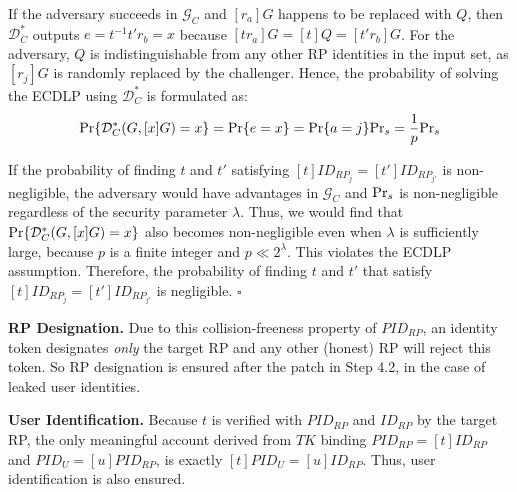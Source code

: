 If the adversary succeeds in $\mathcal{G}_C$ and $[r_a]G$ happens to be replaced with $Q$, then $\mathcal{D}^*_C$ outputs $e=t^{-1}t'r_b =x$ because $[tr_a]G = [t]Q = [t'r_b]G$. For the adversary, $Q$ is indistinguishable from any other RP identities in the input set, as $[r_j]G$ is randomly replaced by the challenger.
Hence, the probability of solving the ECDLP using $\mathcal{D}^*_C$ is formulated as:
\begin{equation*}
{\rm Pr}\{\mathcal{D}^*_C(G, [x]G)=x\} = {\rm Pr}\{e = x\}={\rm Pr}\{a=j\}{\rm Pr}_s=\frac{1}{p}{\rm Pr}_s
\end{equation*}

If the probability of finding $t$ and $t'$ satisfying $[t]ID_{RP_j} = [t']ID_{RP_{j'}}$ is non-negligible, the adversary would have advantages  in $\mathcal{G}_C$ and ${\rm Pr}_s$ is non-negligible regardless of the security parameter $\lambda$.
Thus, we would find that ${\rm Pr}\{\mathcal{D}^*_C(G, [x]G)=x\}$ also becomes non-negligible even when $\lambda$ is sufficiently large, because $p$ is a finite integer and $p \ll 2^\lambda$.
This violates the ECDLP assumption. Therefore, the probability of finding $t$ and $t'$ that satisfy $[t]ID_{RP_j} = [t']ID_{RP_{j'}}$ is negligible.
\hfill $\square$
\vspace{1mm}

\noindent \textbf{RP Designation.} 
Due to this collision-freeness property of $PID_{RP}$,
    an identity token designates \emph{only} the target RP and any other (honest) RP will reject this token.
So RP designation is ensured after the patch in Step 4.2, in the case of leaked user identities.

\noindent \textbf{User Identification.} 
Because $t$ is verified with $PID_{RP}$ and $ID_{RP}$ by the target RP,
 the only meaningful account derived
from $TK$ binding $PID_{RP}=[t]ID_{RP}$ and $PID_U = [u]PID_{RP}$,
 is exactly $[t]PID_U =[u]ID_{RP}$. Thus, user identification is also ensured.

